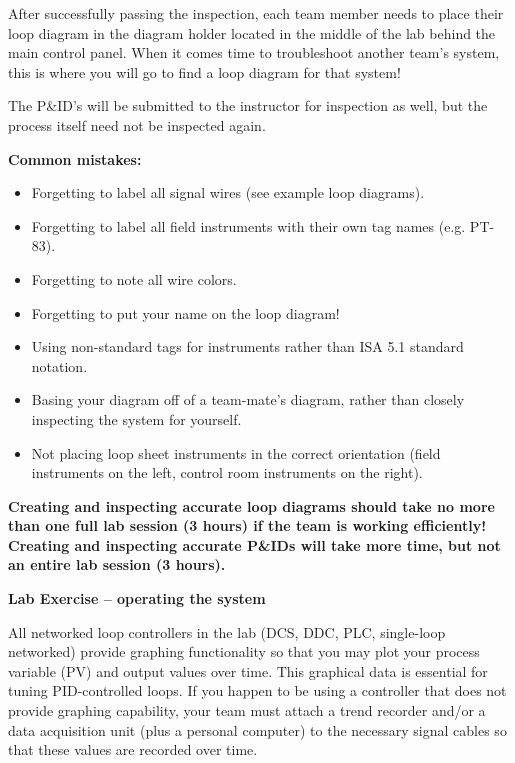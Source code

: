 \documentclass[12pt,a4paper]{book}
\begin{document}
After successfully passing the inspection, each team member needs to place their loop diagram in the diagram holder located in the middle of the lab behind the main control panel.  When it comes time to troubleshoot another team's system, this is where you will go to find a loop diagram for that system!

The P\&ID's will be submitted to the instructor for inspection as well, but the process itself need not be inspected again.

\vskip 10pt

{\bf Common mistakes:}

\begin{itemize}
\item{} Forgetting to label all signal wires (see example loop diagrams).
\item{} Forgetting to label all field instruments with their own tag names (e.g. PT-83).
\item{} Forgetting to note all wire colors.
\item{} Forgetting to put your name on the loop diagram!
\item{} Using non-standard tags for instruments rather than ISA 5.1 standard notation.
\item{} Basing your diagram off of a team-mate's diagram, rather than closely inspecting the system for yourself.
\item{} Not placing loop sheet instruments in the correct orientation (field instruments on the left, control room instruments on the right).
\end{itemize}

\vskip 10pt

{\bf Creating and inspecting accurate loop diagrams should take no more than one full lab session (3 hours) if the team is working efficiently!  Creating and inspecting accurate P\&IDs will take more time, but not an entire lab session (3 hours).}







\vfil \eject

\noindent
{\bf Lab Exercise -- operating the system}

\vskip 5pt

All networked loop controllers in the lab (DCS, DDC, PLC, single-loop networked) provide graphing functionality so that you may plot your process variable (PV) and output values over time.  This graphical data is essential for tuning PID-controlled loops.  If you happen to be using a controller that does not provide graphing capability, your team must attach a trend recorder and/or a data acquisition unit (plus a personal computer) to the necessary signal cables so that these values are recorded over time.
\end{document}
